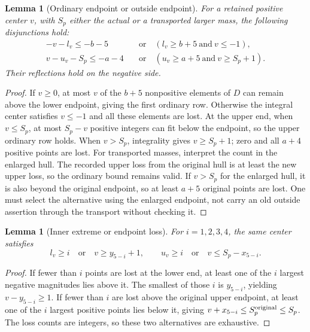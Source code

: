 \documentclass[11pt,a4paper]{article}
\newtheorem{lemma}[theorem]{Lemma}
\begin{document}
\begin{lemma}[Ordinary endpoint or outside endpoint]\label{lem:ordinary}
For a retained positive center $v$, with $S_p$ either the actual or a
transported larger mass, the following disjunctions hold:
\begin{align*}
 -v-l_v\le-b-5\quad&\text{or}\quad(l_v\ge b+5\ \text{and}\ v\le-1),\\
 v-u_v-S_p\le-a-4\quad&\text{or}\quad(u_v\ge a+5\ \text{and}\ v\ge S_p+1).
\end{align*}
Their reflections hold on the negative side.
\end{lemma}
\begin{proof}
If $v\ge0$, at most $v$ of the $b+5$ nonpositive elements of $D$ can
remain above the lower endpoint, giving the first ordinary row.
Otherwise the integral center satisfies $v\le-1$ and all these elements
are lost. At the upper end, when $v\le S_p$, at most $S_p-v$ positive
integers can fit below the endpoint, so the upper ordinary row holds.
When $v>S_p$, integrality gives $v\ge S_p+1$; zero and all $a+4$
positive points are lost.
For transported masses, interpret the count in the enlarged hull.
The recorded upper loss from the original hull is at least the new
upper loss, so the ordinary bound remains valid. If $v>S_p$ for the
enlarged hull, it is also beyond the original endpoint, so at least
$a+5$ original points are lost. One must select the alternative using
the enlarged endpoint, not carry an old outside assertion through the
transport without checking it.
\end{proof}

\begin{lemma}[Inner extreme or endpoint loss]\label{lem:inner}
For $i=1,2,3,4$, the same center satisfies
\[
 l_v\ge i\quad\text{or}\quad v\ge y_{5-i}+1,
 \qquad
 u_v\ge i\quad\text{or}\quad v\le S_p-x_{5-i}.
\]
\end{lemma}
\begin{proof}
If fewer than $i$ points are lost at the lower end, at least one of the
$i$ largest negative magnitudes lies above it. The smallest of those
$i$ is $y_{5-i}$, yielding $v-y_{5-i}\ge1$.
If fewer than $i$ are lost above the original upper endpoint, at least
one of the $i$ largest positive points lies below it, giving
$v+x_{5-i}\le S_p^{\rm original}\le S_p$.
The loss counts are integers, so these two alternatives are exhaustive.
\end{proof}
\end{document}

